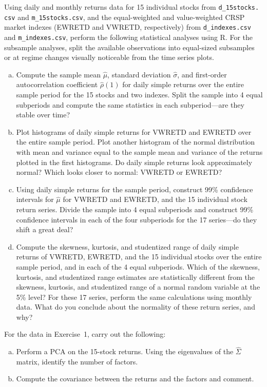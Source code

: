 Using daily and monthly returns data for 15 individual stocks from {\tt d\_15stocks.} {\tt csv} and {\tt m\_15stocks.csv}, and the equal-weighted and value-weighted CRSP market indexes (EWRETD and VWRETD, respectively) from {\tt d\_indexes.csv} and {\tt m\_indexes.csv}, perform the following statistical analyses using R. For the subsample analyses, split the available observations into equal-sized subsamples or at regime changes visually noticeable from the time series plots.

\begin{enumerate}[(a)]
\item Compute the sample mean $\hat\mu$, standard deviation $\hat{\sigma}$, and first-order autocorrelation coefficient $\hat{\rho}(1)$ for daily simple returns over the entire sample period for the 15 stocks and two indexes. Split the sample into 4 equal subperiods and compute the same statistics in each subperiod---are they stable over time?
\item Plot histograms of daily simple returns for VWRETD and EWRETD over the entire sample period. Plot another histogram of the normal distribution with mean and variance equal to the sample mean and variance of the returns plotted in the first histograms. Do daily simple returns look approximately normal? Which looks closer to normal: VWRETD or EWRETD?
\item Using daily simple returns for the sample period, construct 99\% confidence intervals for $\hat{\mu}$ for VWRETD and EWRETD, and the 15 individual stock return series. Divide the sample into 4 equal subperiods and construct 99\% confidence intervals in each of the four subperiods for the 17 series---do they shift a great deal?
\item Compute the skewness, kurtosis, and studentized range of daily simple returns of VWRETD, EWRETD, and the 15 individual stocks over the entire sample period, and in each of the 4 equal subperiods. Which of the skewness, kurtosis, and studentized range estimates are statistically different from the skewness, kurtosis, and studentized range of a normal random variable at the 5\% level? For these 17 series, perform the same calculations using monthly data. What do you conclude about the normality of these return series, and why? \twomedskip
\end{enumerate}


\prob For the data in Exercise~1, carry out the following:

\begin{enumerate}[(a)]
\item Perform a PCA on the 15-stock returns. Using the eigenvalues of the $\hat{\Sigma}$ matrix, identify the number of factors.
\item Compute the covariance between the returns and the factors and comment. \twomedskip
\end{enumerate}


